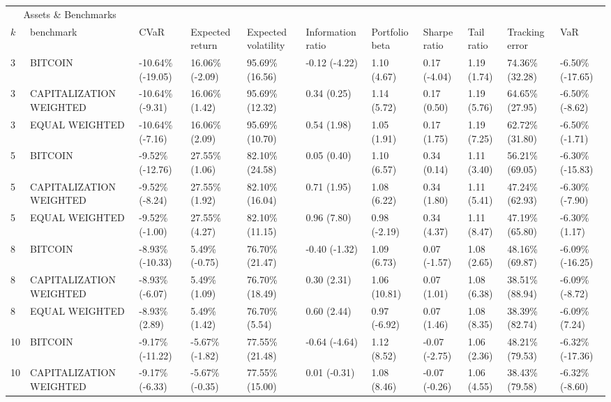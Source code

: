 \documentclass{article}
\begin{document}
\begin{landscape}
\begin{table}[H]
  \centering
  \begin{tabular}{p{0.4cm}|p{3cm}|p{1.65cm}|p{1.65cm}|p{1.65cm}|p{1.65cm}|p{1.65cm}|p{1.65cm}|p{1.65cm}|p{1.65cm}|p{1.65cm}}%
    \toprule
    \multicolumn{2}{c}{Assets \& Benchmarks}                   \\
    \cmidrule(r){1-2}
    $k$ & benchmark & CVaR & Expected return & Expected volatility&Information ratio&Portfolio beta&Sharpe ratio&Tail ratio&Tracking error&VaR\\
    \midrule
    3 & BITCOIN & -10.64\% (-19.05) & 16.06\% (-2.09) & 95.69\% (16.56) & -0.12 (-4.22) &	1.10 (4.67) & 0.17 (-4.04)& 1.19 (1.74)& 74.36\% (32.28)& -6.50\% (-17.65) \\
   3&CAPITALIZATION WEIGHTED&-10.64\% (-9.31)&16.06\% (1.42)&95.69\% (12.32)&0.34 (0.25)&1.14 (5.72)&0.17 (0.50)&1.19 (5.76)&64.65\% (27.95)&-6.50\% (-8.62)
\\ 
3&EQUAL WEIGHTED&-10.64\% (-7.16)&16.06\% (2.09)&95.69\% (10.70)&0.54 (1.98)&1.05 (1.91)&0.17 (1.75)&1.19 (7.25)&62.72\% (31.80)&-6.50\% (-1.71)
\\ 
5&BITCOIN&-9.52\% (-12.76)&27.55\% (1.06)&82.10\% (24.58)&0.05 (0.40)&1.10 (6.57)&0.34 (0.14)&1.11 (3.40)&56.21\% (69.05)&-6.30\% (-15.83)
\\ 
5&CAPITALIZATION WEIGHTED&-9.52\% (-8.24)&27.55\% (1.92)&82.10\% (16.04)&0.71 (1.95)&1.08 (6.22)&0.34 (1.80)&1.11 (5.41)&47.24\% (62.93)&-6.30\% (-7.90)
\\ 
5&EQUAL WEIGHTED&-9.52\% (-1.00)&27.55\% (4.27)&82.10\% (11.15)&0.96 (7.80)&0.98 (-2.19)&0.34 (4.37)&1.11 (8.47)&47.19\% (65.80)&-6.30\% (1.17)
\\ 
8&BITCOIN&-8.93\% (-10.33)&5.49\% (-0.75)&76.70\% (21.47)&-0.40 (-1.32)&1.09 (6.73)&0.07 (-1.57)&1.08 (2.65)&48.16\% (69.87)&-6.09\% (-16.25)
\\ 
8&CAPITALIZATION WEIGHTED&-8.93\% (-6.07)&5.49\% (1.09)&76.70\% (18.49)&0.30 (2.31)&1.06 (10.81)&0.07 (1.01)&1.08 (6.38)&38.51\% (88.94)&-6.09\% (-8.72)
\\ 
8&EQUAL WEIGHTED&-8.93\% (2.89)&5.49\% (1.42)&76.70\% (5.54)&0.60 (2.44)&0.97 (-6.92)&0.07 (1.46)&1.08 (8.35)&38.39\% (82.74)&-6.09\% (7.24)
\\ 
10&BITCOIN&-9.17\% (-11.22)&-5.67\% (-1.82)&77.55\% (21.48)&-0.64 (-4.64)&1.12 (8.52)&-0.07 (-2.75)&1.06 (2.36)&48.21\% (79.53)&-6.32\% (-17.36)
\\ 
10&CAPITALIZATION WEIGHTED&-9.17\% (-6.33)&-5.67\% (-0.35)&77.55\% (15.00)&0.01 (-0.31)&1.08 (8.46)&-0.07 (-0.26)&1.06 (4.55)&38.43\% (79.58)&-6.32\% (-8.60)

\end{tabular}
\end{table}
\end{landscape}
\end{document}
